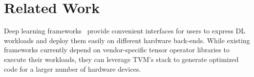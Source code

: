 \documentclass[letterpaper,twocolumn,10pt]{article}
\newcommand{\TensorOpt}{TVM\xspace}
\begin{document}


\section{Related Work}
\label{sec:rel}

Deep learning frameworks~\cite{tensorflow-osdi,Bastien-Theano-2012,MXNet-whitepaper,CNTK}
provide convenient interfaces for users to express DL workloads and deploy them easily on different hardware back-ends.
While existing frameworks currently depend on vendor-specific tensor operator libraries to execute their workloads, they can leverage \TensorOpt's stack to generate optimized code for a larger number of hardware devices.
\end{document}
